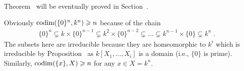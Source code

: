 \documentclass[a4paper,parskip=half,numbers=enddot, DIV=12]{scrreprt}
\renewcommand{\geq}{\geqslant}
\begin{document}
	Theorem~ will be eventually proved in Section~.
	\begin{rem}[a.k.a. Remark 5]
		Obviously $\codim(\{0\}^n, k^n) \geq n$ because of the chain 
		\begin{align*}
				\{0\}^n\subsetneq k\times \{0\}^{n-1}\subsetneq k^2\times\{0\}^{n-2}\subsetneq \ldots \subsetneq k^{n-1}\times\{0\} \subsetneq k^n\;.
		\end{align*}
	The subsets here are irreducible because they are homeomorphic to $k^i$ which is irreducible by Proposition~ as $k[X_1,\ldots,X_i]$ is a domain (i.e., $\{0\}$ is prime). Similarly, $\codim(\{x\}, X) \geq n$ for any $x\in X =k^n$.
	\end{rem}
	
\end{document}
